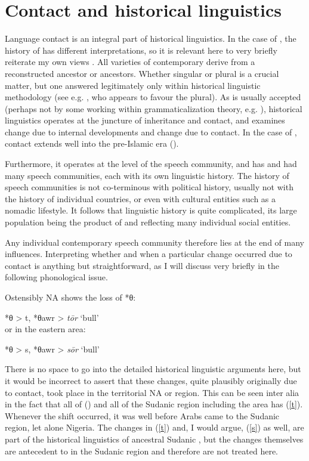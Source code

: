 \documentclass[output=paper]{langsci/langscibook}
\begin{document}
\section{Contact and historical linguistics
}


Language contact is an integral part of historical linguistics. In the case of , the history of  has different interpretations, so it is relevant here to very briefly reiterate my own views \citep{Owens2006}. All varieties of contemporary  derive from a reconstructed ancestor or ancestors. Whether singular or plural is a crucial matter, but one answered legitimately only within historical linguistic methodology (see e.g. \citealt{Retsö2013}, who appears to favour the plural). As is usually accepted (perhaps not by some working within {grammaticalization} theory, e.g. \citealt{HeineKuteva2011}), historical linguistics operates at the juncture of inheritance and contact, and examines change due to internal developments and change due to contact. In the case of , contact extends well into the pre-Islamic era (\citealt{Owens2013,Owens2016Aramaic,Owensforthcoming}).

Furthermore, it operates at the level of the {speech community}, and  has and had many speech communities, each with its own linguistic history. The history of speech communities is not co-terminous with political history, usually not with the history of individual countries, or even with cultural entities such as a nomadic lifestyle. It follows that  linguistic history is quite complicated, its large population being the product of and reflecting many individual social entities.


Any individual contemporary  {speech community} therefore lies at the end of many influences. Interpreting whether and when a particular change occurred due to contact is anything but straightforward, as I will discuss very briefly in the following phonological issue.

Ostensibly NA shows the loss of *θ:

\ea\label{t}
*\textup{θ} > t, \textup{*}θawr > \textit{tōr}  \textup{‘bull’}\\
\z
  or in the eastern area:

\ea\label{s}
  *θ > s, \textup{*}θawr > \textit{sōr} \textup{‘bull’}\\
\z


There is no space to go into the detailed historical linguistic arguments here, but it would be incorrect to assert that these changes, quite plausibly originally due to contact, took place in the territorial NA or  region. This can be seen inter alia in the fact that all of  () and all of the Sudanic region including the  area has (\ref{t}). Whenever the shift occurred, it was well before Arabs came to the Sudanic region, let alone Nigeria. The changes in (\ref{t}) and, I would argue, (\ref{s}) as well, are part of the historical linguistics of ancestral Sudanic , but the changes themselves are antecedent to  in the Sudanic region and therefore are not treated here.
\end{document}
